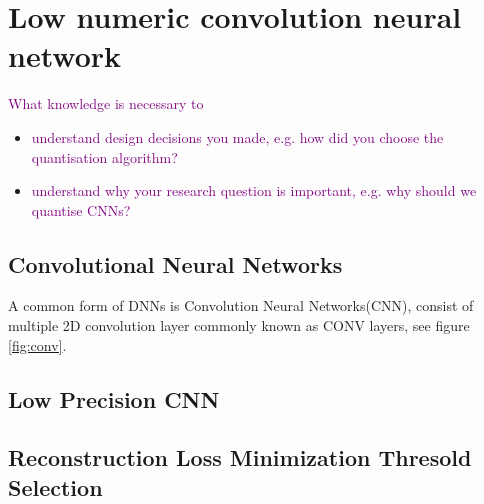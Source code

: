 \chapter{Low numeric convolution neural network}
\label{ch:low prec NN}
\textcolor{purple}{What knowledge is necessary to}
\begin{itemize}
    \item \textcolor{purple}{understand design decisions you made, e.g. how did you choose the quantisation algorithm?}
    \item \textcolor{purple}{understand why your research question is important, e.g. why should we quantise CNNs?}
\end{itemize}

\section{Convolutional Neural Networks}
A common form of DNNs is Convolution Neural Networks(CNN), consist of multiple 2D convolution layer commonly known as CONV layers, see figure \ref{fig:conv}. 
\section{Low Precision CNN}
\section{Reconstruction Loss Minimization Thresold Selection}